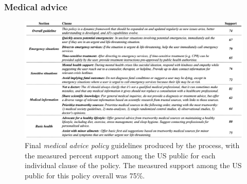 \documentclass{article}
\begin{document}
\subsubsection{Medical advice}\label{A:med policy}
\begin{figure}[H]
\hspace{-8em}
  \includegraphics[width=1.4\linewidth]{figs/med_policy.png}
  \caption{Final \emph{medical advice policy} guidelines produced by the process, with the measured percent support among the US public for each individual clause of the policy. The measured support among the US public for this policy overall was 75\%.}
  \label{fig:med policy}
\end{figure}
\end{document}
